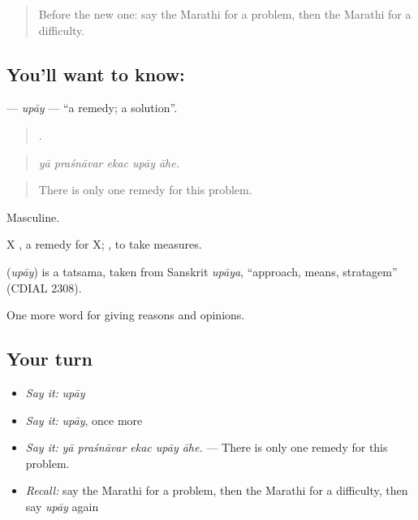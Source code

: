 \label{lesson:MR-C349-upay}



\begin{quote}
Before the new one: say the Marathi for a problem, then the Marathi for a difficulty.
\end{quote}

\subsection*{You'll want to know: }
\textbf{} — \emph{upāy} — \textquotedblleft{}a remedy; a solution\textquotedblright{}.

\begin{quote}
    .
\end{quote}

\begin{quote}
\emph{yā praśnāvar ekac upāy āhe.}
\end{quote}

\begin{quote}
There is only one remedy for this problem.
\end{quote}

Masculine.

X  , a remedy for X;  , to take measures.

\begin{cousinweb}
\textbf{} (\emph{upāy}) is a tatsama, taken from Sanskrit \emph{upāya}, \textquotedblleft{}approach, means, stratagem\textquotedblright{} (CDIAL 2308).
\end{cousinweb}

\begin{grammarlens}[title={What you've built}]
One more word for giving reasons and opinions.
\end{grammarlens}

\subsection*{Your turn}
\begin{itemize}
\raggedright
  \item \emph{Say it:} \emph{upāy}
  \item \emph{Say it:} \emph{upāy}, once more
  \item \emph{Say it:} \emph{yā praśnāvar ekac upāy āhe.} — There is only one remedy for this problem.
  \item \emph{Recall:} say the Marathi for a problem, then the Marathi for a difficulty, then say \emph{upāy} again
\end{itemize}

